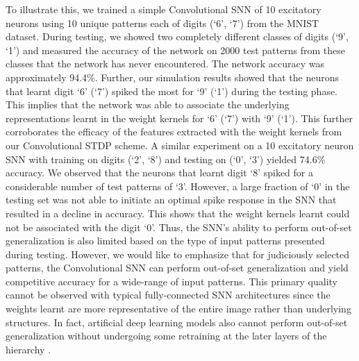 \documentclass[journal, onecolumn]{IEEEtran}
\begin{document}
To illustrate this, we trained a simple Convolutional SNN of 10 excitatory neurons using 10 unique patterns each of digits (`6', `7') from the MNIST dataset. During testing, we showed two completely different classes of digits (`9', `1') and measured the accuracy of the network on 2000 test patterns from these classes that the network has never encountered. The network accuracy was approximately 94.4\%. Further, our simulation results showed that the neurons that learnt digit `6' (`7') spiked the most for `9' (`1') during the testing phase. This implies that the network was able to associate the underlying representations learnt in the weight kernels for `6' (`7') with `9' (`1'). This further corroborates the efficacy of the features extracted with the weight kernels from our Convolutional STDP scheme. A similar experiment on a 10 excitatory neuron SNN with training on digits (`2', `8') and testing on (`0', `3') yielded 74.6\% accuracy. We observed that the neurons that learnt digit `8' spiked for a considerable number of test patterns of `3'. However, a large fraction of `0' in the testing set was not able to initiate an optimal spike response in the SNN that resulted in a decline in accuracy. This shows that the weight kernels learnt could not be associated with the digit `0'.  Thus, the SNN’s ability to perform out-of-set generalization is also limited based on the type of input patterns presented during testing. However, we would like to emphasize that for judiciously selected patterns, the Convolutional SNN can perform out-of-set generalization and yield competitive accuracy for a wide-range of input patterns. This primary quality cannot be observed with typical fully-connected SNN architectures since the weights learnt are more representative of the entire image rather than underlying structures. In fact, artificial deep learning models also cannot perform out-of-set generalization without undergoing some retraining at the later layers of the hierarchy \cite{scheirer2014probability}.
\end{document}
